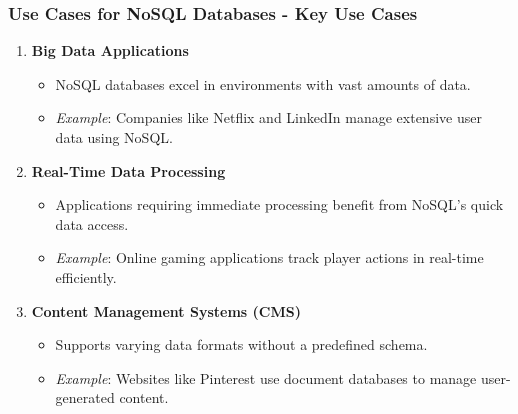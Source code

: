 \documentclass[aspectratio=169]{beamer}
\begin{document}
\begin{frame}[fragile]
    \frametitle{Use Cases for NoSQL Databases - Key Use Cases}
    \begin{enumerate}
        \item \textbf{Big Data Applications}
            \begin{itemize}
                \item NoSQL databases excel in environments with vast amounts of data.
                \item \textit{Example}: Companies like Netflix and LinkedIn manage extensive user data using NoSQL.
            \end{itemize}

        \item \textbf{Real-Time Data Processing}
            \begin{itemize}
                \item Applications requiring immediate processing benefit from NoSQL’s quick data access.
                \item \textit{Example}: Online gaming applications track player actions in real-time efficiently.
            \end{itemize}

        \item \textbf{Content Management Systems (CMS)}
            \begin{itemize}
                \item Supports varying data formats without a predefined schema.
                \item \textit{Example}: Websites like Pinterest use document databases to manage user-generated content.
            \end{itemize}
    \end{enumerate}
\end{frame}
\end{document}
